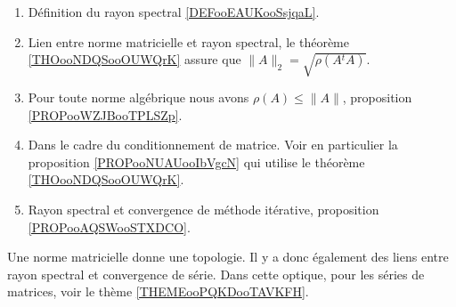              \label{THEMEooOJJFooWMSAtL}

    \begin{enumerate}
        \item
            Définition du rayon spectral \ref{DEFooEAUKooSsjqaL}.
        \item
            Lien entre norme matricielle et rayon spectral, le théorème \ref{THOooNDQSooOUWQrK} assure que $\|A\|_2=\sqrt{\rho(A{^t}A)}$.
        \item
            Pour toute norme algébrique nous avons \( \rho(A)\leq \| A \|\), proposition \ref{PROPooWZJBooTPLSZp}.
        \item
            Dans le cadre du conditionnement de matrice. Voir en particulier la proposition \ref{PROPooNUAUooIbVgcN} qui utilise le théorème \ref{THOooNDQSooOUWQrK}.
        \item
            Rayon spectral et convergence de méthode itérative, proposition \ref{PROPooAQSWooSTXDCO}.
    \end{enumerate}

    Une norme matricielle donne une topologie. Il y a donc également des liens entre rayon spectral et convergence de série. Dans cette optique, pour les séries de matrices, voir le thème \ref{THEMEooPQKDooTAVKFH}.
